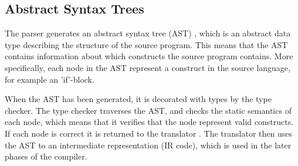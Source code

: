 \subsection{Abstract Syntax Trees}
\label{sec:AST}
The parser generates an abstract syntax tree (AST) \citep{CraftingACompiler}, which is an abstract data type describing the structure of the source program. This means that the AST contains information about which constructs the source program contains. More specifically, each node in the AST represent a construct in the source language, for example an 'if'-block.

When the AST has been generated, it is decorated with types by the type checker. The type checker traverses the AST, and checks the static semantics of each node, which means that it verifies that the node represent valid constructs. If each node is correct it is returned to the translator \citep{CraftingACompiler}. The translator then uses the AST to an intermediate representation (IR code), which is used in the later phases of the compiler.
